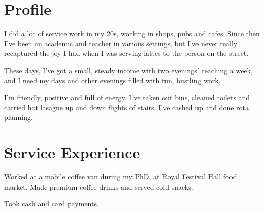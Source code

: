 \documentclass[a4paper,nomath]{deedy-resume} %
\begin{document}
%
\begin{minipage}[t]{0.66\textwidth} %


    \section{Profile}
    I did a lot of service work in my 20s, working in shops, pubs and cafes.
    Since then I've been an academic and teacher in various  settings, but I've never really recaptured the joy I had when I was serving lattes to the person on the street.
    
    \vspace{1em}

	These days, I've got a small, steady income with two evenings' teaching a week, and I need my days and
	other evenings filled with fun, bustling work.
    
    \vspace{1em}

    I'm friendly, positive and full of energy.
    I've taken out bins, cleaned toilets and carried hot lasagne up and down flights of stairs. I've cashed up and done rota planning.


    \section{Service Experience}


    \vspace{\topsep} %
    \begin{tightitemize}
    	\item Worked at a mobile coffee van during my PhD, at Royal Festival Hall food market. Made premium coffee drinks and served cold snacks.
    	\item Took cash and card payments.
    	

\end{tightitemize}
\end{minipage}
\end{document}
